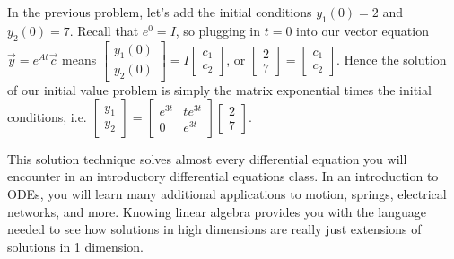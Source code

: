 In the previous problem, let's add the initial conditions $y_1(0)=2$ and $y_2(0)=7$. Recall that $e^0=I$, so plugging in $t=0$ into our vector equation $\vec y = e^{At}\vec c$ means 
$
\begin{bmatrix}
y_1(0)\\
y_2(0)
\end{bmatrix}
=I
\begin{bmatrix}
c_1\\
c_2
\end{bmatrix}
$, or 
$
\begin{bmatrix}
2\\
7
\end{bmatrix}
=
\begin{bmatrix}
c_1\\
c_2
\end{bmatrix}
$. Hence the solution of our initial value problem is simply the matrix exponential times the initial conditions, i.e.
$
\begin{bmatrix}
y_1\\
y_2
\end{bmatrix}
=
\begin{bmatrix}
e^{3t}&te^{3t}\\
0&e^{3t}
\end{bmatrix}
\begin{bmatrix}
2\\
7
\end{bmatrix}
$.

This solution technique solves almost every differential equation you will encounter in an introductory differential equations class. In an introduction to ODEs, you will learn many additional applications to motion, springs, electrical networks, and more. Knowing linear algebra provides you with the language needed to see how solutions in high dimensions are really just extensions of solutions in 1 dimension.


